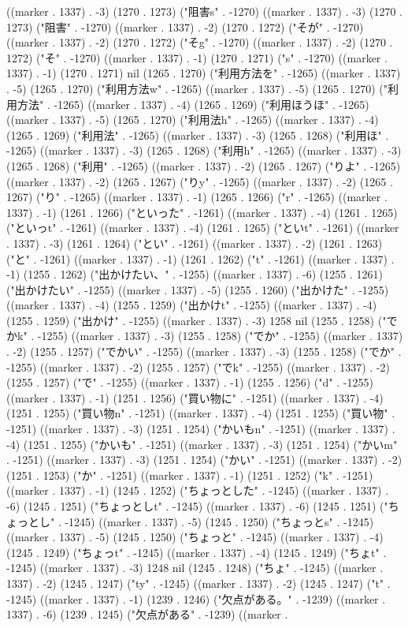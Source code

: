 ((marker . 1337) . -3) (1270 . 1273) ("阻害s" . -1270) ((marker . 1337) . -3) (1270 . 1273) ("阻害" . -1270) ((marker . 1337) . -2) (1270 . 1272) ("そが" . -1270) ((marker . 1337) . -2) (1270 . 1272) ("そg" . -1270) ((marker . 1337) . -2) (1270 . 1272) ("そ" . -1270) ((marker . 1337) . -1) (1270 . 1271) ("s" . -1270) ((marker . 1337) . -1) (1270 . 1271) nil (1265 . 1270) ("利用方法を" . -1265) ((marker . 1337) . -5) (1265 . 1270) ("利用方法w" . -1265) ((marker . 1337) . -5) (1265 . 1270) ("利用方法" . -1265) ((marker . 1337) . -4) (1265 . 1269) ("利用ほうほ" . -1265) ((marker . 1337) . -5) (1265 . 1270) ("利用法h" . -1265) ((marker . 1337) . -4) (1265 . 1269) ("利用法" . -1265) ((marker . 1337) . -3) (1265 . 1268) ("利用ほ" . -1265) ((marker . 1337) . -3) (1265 . 1268) ("利用h" . -1265) ((marker . 1337) . -3) (1265 . 1268) ("利用" . -1265) ((marker . 1337) . -2) (1265 . 1267) ("りよ" . -1265) ((marker . 1337) . -2) (1265 . 1267) ("りy" . -1265) ((marker . 1337) . -2) (1265 . 1267) ("り" . -1265) ((marker . 1337) . -1) (1265 . 1266) ("r" . -1265) ((marker . 1337) . -1) (1261 . 1266) ("といった" . -1261) ((marker . 1337) . -4) (1261 . 1265) ("といっt" . -1261) ((marker . 1337) . -4) (1261 . 1265) ("といt" . -1261) ((marker . 1337) . -3) (1261 . 1264) ("とい" . -1261) ((marker . 1337) . -2) (1261 . 1263) ("と" . -1261) ((marker . 1337) . -1) (1261 . 1262) ("t" . -1261) ((marker . 1337) . -1) (1255 . 1262) ("出かけたい、" . -1255) ((marker . 1337) . -6) (1255 . 1261) ("出かけたい" . -1255) ((marker . 1337) . -5) (1255 . 1260) ("出かけた" . -1255) ((marker . 1337) . -4) (1255 . 1259) ("出かけt" . -1255) ((marker . 1337) . -4) (1255 . 1259) ("出かけ" . -1255) ((marker . 1337) . -3) 1258 nil (1255 . 1258) ("でかk" . -1255) ((marker . 1337) . -3) (1255 . 1258) ("でか" . -1255) ((marker . 1337) . -2) (1255 . 1257) ("でかい" . -1255) ((marker . 1337) . -3) (1255 . 1258) ("でか" . -1255) ((marker . 1337) . -2) (1255 . 1257) ("でk" . -1255) ((marker . 1337) . -2) (1255 . 1257) ("で" . -1255) ((marker . 1337) . -1) (1255 . 1256) ("d" . -1255) ((marker . 1337) . -1) (1251 . 1256) ("買い物に" . -1251) ((marker . 1337) . -4) (1251 . 1255) ("買い物n" . -1251) ((marker . 1337) . -4) (1251 . 1255) ("買い物" . -1251) ((marker . 1337) . -3) (1251 . 1254) ("かいもn" . -1251) ((marker . 1337) . -4) (1251 . 1255) ("かいも" . -1251) ((marker . 1337) . -3) (1251 . 1254) ("かいm" . -1251) ((marker . 1337) . -3) (1251 . 1254) ("かい" . -1251) ((marker . 1337) . -2) (1251 . 1253) ("か" . -1251) ((marker . 1337) . -1) (1251 . 1252) ("k" . -1251) ((marker . 1337) . -1) (1245 . 1252) ("ちょっとした" . -1245) ((marker . 1337) . -6) (1245 . 1251) ("ちょっとしt" . -1245) ((marker . 1337) . -6) (1245 . 1251) ("ちょっとし" . -1245) ((marker . 1337) . -5) (1245 . 1250) ("ちょっとs" . -1245) ((marker . 1337) . -5) (1245 . 1250) ("ちょっと" . -1245) ((marker . 1337) . -4) (1245 . 1249) ("ちょっt" . -1245) ((marker . 1337) . -4) (1245 . 1249) ("ちょt" . -1245) ((marker . 1337) . -3) 1248 nil (1245 . 1248) ("ちょ" . -1245) ((marker . 1337) . -2) (1245 . 1247) ("ty" . -1245) ((marker . 1337) . -2) (1245 . 1247) ("t" . -1245) ((marker . 1337) . -1) (1239 . 1246) ("欠点がある。" . -1239) ((marker . 1337) . -6) (1239 . 1245) ("欠点がある" . -1239) ((marker . 